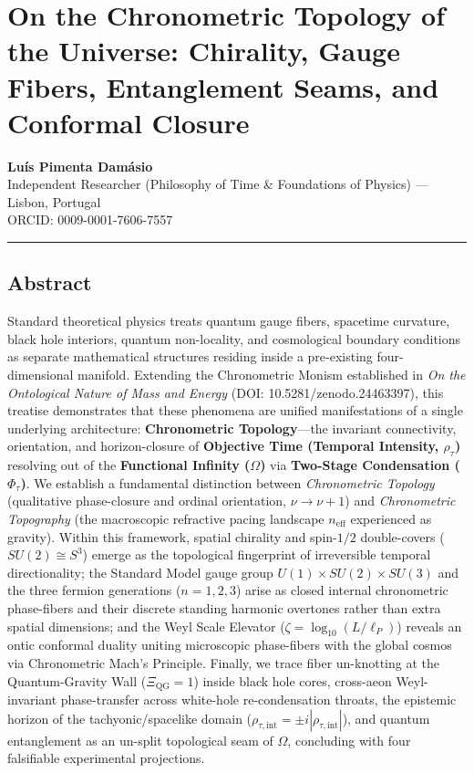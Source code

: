 \documentclass[
]{article}
\author{}
\date{}
\begin{document}
\section{On the Chronometric Topology of the Universe: Chirality, Gauge
Fibers, Entanglement Seams, and Conformal
Closure}\label{on-the-chronometric-topology-of-the-universe-chirality-gauge-fibers-entanglement-seams-and-conformal-closure}

\textbf{Luís Pimenta Damásio}\\
Independent Researcher (Philosophy of Time \& Foundations of Physics)
--- Lisbon, Portugal\\
ORCID: 0009-0001-7606-7557

\begin{center}\rule{0.5\linewidth}{0.5pt}\end{center}

\subsection{Abstract}\label{abstract}

Standard theoretical physics treats quantum gauge fibers, spacetime
curvature, black hole interiors, quantum non-locality, and cosmological
boundary conditions as separate mathematical structures residing inside
a pre-existing four-dimensional manifold. Extending the Chronometric
Monism established in \emph{On the Ontological Nature of Mass and
Energy} (DOI: 10.5281/zenodo.24463397), this treatise demonstrates that
these phenomena are unified manifestations of a single underlying
architecture: \textbf{Chronometric Topology}---the invariant
connectivity, orientation, and horizon-closure of \textbf{Objective Time
(Temporal Intensity, \(\rho_\tau\))} resolving out of the
\textbf{Functional Infinity (\(\Omega\))} via \textbf{Two-Stage
Condensation (\(\Phi_\tau\))}. We establish a fundamental distinction
between \emph{Chronometric Topology} (qualitative phase-closure and
ordinal orientation, \(\nu \to \nu + 1\)) and \emph{Chronometric
Topography} (the macroscopic refractive pacing landscape
\(n_{\text{eff}}\) experienced as gravity). Within this framework,
spatial chirality and spin-\(1/2\) double-covers (\(SU(2) \cong S^3\))
emerge as the topological fingerprint of irreversible temporal
directionality; the Standard Model gauge group
\(U(1) \times SU(2) \times SU(3)\) and the three fermion generations
(\(n = 1, 2, 3\)) arise as closed internal chronometric phase-fibers and
their discrete standing harmonic overtones rather than extra spatial
dimensions; and the Weyl Scale Elevator
(\(\zeta = \log_{10}(L/\ell_P)\)) reveals an ontic conformal duality
uniting microscopic phase-fibers with the global cosmos via Chronometric
Mach's Principle. Finally, we trace fiber un-knotting at the
Quantum-Gravity Wall (\(\Xi_{\text{QG}} = 1\)) inside black hole cores,
cross-aeon Weyl-invariant phase-transfer across white-hole
re-condensation throats, the epistemic horizon of the
tachyonic/spacelike domain
(\(\rho_{\tau,\text{int}} = \pm i|\rho_{\tau,\text{int}}|\)), and
quantum entanglement as an un-split topological seam of \(\Omega\),
concluding with four falsifiable experimental projections.
\end{document}
